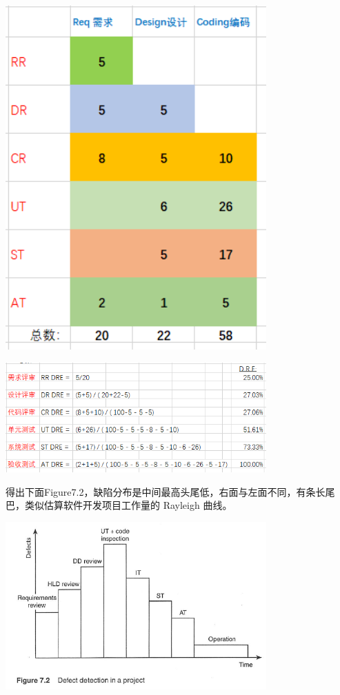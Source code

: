 \includegraphics[width=10cm]{1113correctEgScreenshot_2021-11-13_212414.png}


\includegraphics[width=10cm]{1113corrDreScreenshot_2021-11-13_212509.png}

得出下面Figure7.2，缺陷分布是中间最高头尾低，右面与左面不同，有条长尾巴，类似估算软件开发项目工作量的
Rayleigh 曲线。


\includegraphics[width=10cm]{jalote_emm_72.png}

